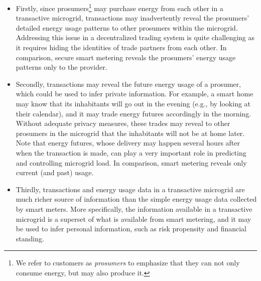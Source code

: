 \begin{itemize}
\item Firstly, since prosumers\footnote{We refer to customers as \emph{prosumers} to emphasize that they can not only consume energy, but may also produce it.}  may purchase energy from each other in a transactive microgrid, transactions may inadvertently reveal the prosumers' detailed energy usage patterns to other prosumers within the microgrid.
Addressing this issue in a decentralized trading system is quite challenging as it requires hiding the identities of trade partners from each other.
In comparison, secure smart metering reveals the prosumers' energy usage patterns  only to the provider. 
\item Secondly,  transactions may reveal the future energy usage of a prosumer, which could be used to infer private information.
For example, a smart home may know that its inhabitants will go out in the evening (e.g., by looking at their calendar), and it may trade energy futures accordingly in the morning.
Without adequate privacy measures, these trades may reveal to other prosumers in the microgrid that the inhabitants will not be at home later.
Note that energy futures, whose delivery may happen several hours after when the transaction is made, can play a very important role in predicting and controlling microgrid load.
In comparison, smart metering reveals only current (and past) usage.
\item Thirdly, transactions and energy usage data in a transactive microgrid are much richer source of information than the simple energy usage data collected by smart meters.
More specifically, the information available in a transactive microgrid is a superset of what is available from smart metering, and it may be used to infer personal information, such as risk propensity and financial standing.
\end{itemize}


